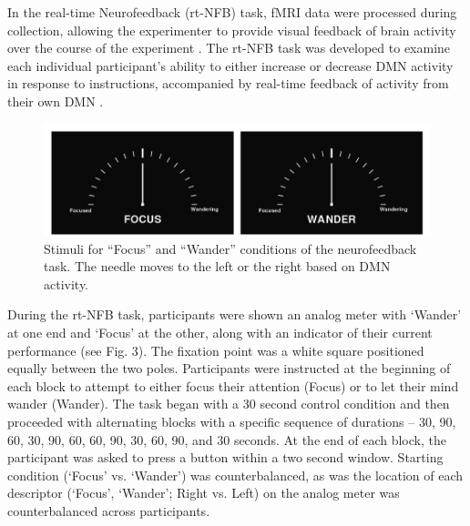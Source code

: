In the real-time Neurofeedback (rt-NFB) task, fMRI data were processed during collection, allowing the experimenter to provide visual feedback of brain activity over the course of the experiment \cite{Cox1995,LaConte2011}. The rt-NFB task was developed to examine each individual participant’s ability to either increase or decrease DMN activity in response to instructions, accompanied by real-time feedback of activity from their own DMN \cite{Craddock2012}.

\begin{figure}[h!]
   \centering
   \includegraphics[width=.9\textwidth]{nfb_stim.png}
   \caption{Stimuli for “Focus” and “Wander” conditions of the neurofeedback task. The needle moves to the left or the right based on DMN activity.}
   \label{fig:nfb}
\end{figure}

During the rt-NFB task, participants were shown an analog meter with ‘Wander’ at one end and ‘Focus’ at the other, along with an indicator of their current performance (see Fig. 3). The fixation point was a white square positioned equally between the two poles. Participants were instructed at the beginning of each block to attempt to either focus their attention (Focus) or to let their mind wander (Wander). The task began with a 30 second control condition and then proceeded with alternating blocks with a specific sequence of durations -- 30, 90, 60, 30, 90, 60, 60, 90, 30, 60, 90, and 30 seconds. At the end of each block, the participant was asked to press a button within a two second window. Starting condition (‘Focus’ vs. ‘Wander’) was counterbalanced, as was the location of each descriptor (‘Focus’, ‘Wander’; Right vs. Left) on the analog meter was counterbalanced across participants.

